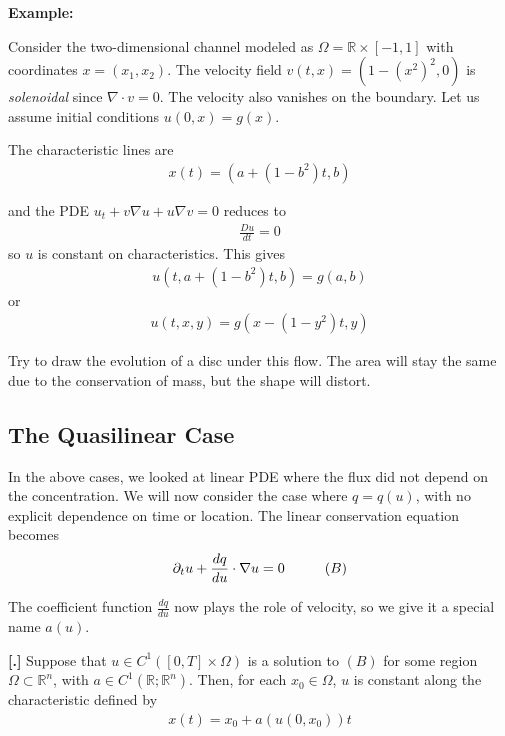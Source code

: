 \documentclass{article}
\newcommand{\R}{{\mathbb{R}}}
\newcommand{\pd}{\partial}
\newcounter{result}[section]
\newenvironment{res}[1][]{\vspace{0.5 cm} \refstepcounter{result}\par\medskip
	\noindent \textbf{[\thesection.\theresult] #1} \rmfamily}{\vspace{0.5 cm}}
\begin{document}
	\vspace{0.25 cm}
	
	\textbf{Example:}
	
	Consider the two-dimensional channel modeled as $\Omega = \R \times [-1,1]$ with coordinates $x = (x_1,x_2)$. The velocity field $v(t,x) = (1-(x^2)^2,0)$ is \textit{solenoidal} since $\nabla \cdot v = 0$. The velocity also vanishes on the boundary. Let us assume initial conditions $u(0,x) = g(x)$.
	
	The characteristic lines are 
	\begin{align*}
		x(t) = (a+(1-b^{2})t,b)
	\end{align*}
	
	and the PDE $u_{t} + v\nabla u + u \nabla v = 0$ reduces to 
	\begin{align*}
		\frac{Du}{dt} =0
	\end{align*}
	so $u$ is constant on characteristics. This gives
	\begin{align*}
		u(t,a+(1-b^2)t,b) = g(a,b)
	\end{align*}
	or 
	\begin{align*}
		u(t,x,y) = g(x-(1-y^2)t,y)
	\end{align*}
	
	Try to draw the evolution of a disc under this flow. The area will stay the same due to the conservation of mass, but the shape will distort. 
	
	\vspace{0.25 cm}
	
	
	\subsection{The Quasilinear Case} 
	
	In the above cases, we looked at linear PDE where the flux did not depend on the concentration. We will now consider the case where $q = q(u)$, with no explicit dependence on time or location. The linear conservation equation becomes
	\begin{align*}
		\pd_{t}u + \frac{dq}{du} \cdot \nabla u = 0 \hspace{1 cm} (B)
	\end{align*}
	
	The coefficient function $\frac{dq}{du}$ now plays the role of velocity, so we give it a special name $a(u)$. 
	\begin{res}
		Suppose that $u \in C^{1}([0,T] \times \Omega )$ is a solution to $(B)$ for some region $\Omega \subset \R^{n}$, with $a \in C^{1}(\R; \R^{n})$. Then, for each $x_0 \in \Omega$, $u$ is constant along the characteristic defined by 
		\begin{align*}
			x(t) = x_0 + a(u(0,x_0)) t
		\end{align*}
	\end{res}
	
\end{document}
